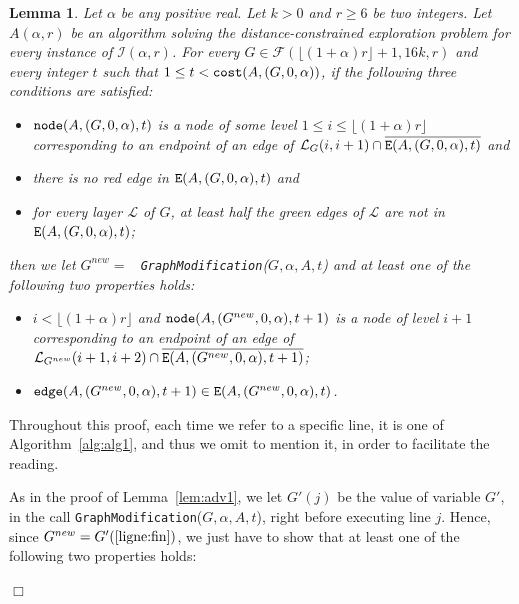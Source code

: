 \documentclass[11pt]{article}
\newtheorem{lemma}{Lemma}[section]
\newcommand{\qed}{\hfill $\Box$ \bigbreak}
\newenvironment{proof}{\noindent {\bf Proof.}}{\qed}
\begin{document}
{\begin{lemma}
\label{lem:adv2}
Let $\alpha$ be any positive real. Let $k>0$ and $r\geq 6$ be two integers.
%
Let $A(\alpha,r)$ be an algorithm solving the distance-constrained exploration problem for every instance of $\mathcal{I}(\alpha,r)$.
%
For every $G\in\mathcal{F}(\lfloor(1+\alpha)r\rfloor+1,16k,r)$ and every integer $t$ such that $1\leq t < {\tt cost}(A,(G,0,\alpha))$, if the following three conditions are satisfied: 
\begin{itemize}
\item ${\tt node}(A,(G,0,\alpha),t)$ is a node of some level $1\leq i\leq\lfloor(1+\alpha)r\rfloor$ corresponding to an endpoint of an edge of $\mathcal{L}_{G}(i,i+1)\cap\overline{{\tt E}(A,(G,0,\alpha),t)}$ and
\item there is no red edge in ${\tt E}(A,(G,0,\alpha),t)$ and
\item for every layer $\mathcal{L}$ of $G$, at least half the green edges of $\mathcal{L}$ are not in ${\tt E}(A,(G,0,\alpha),t)$;
\end{itemize} 
then we let $G^{new}=$ {\tt
  GraphModification}($G,\alpha,A,t$) and at least one of the
following two properties holds:
\begin{itemize}
\item $i<\lfloor(1+\alpha)r\rfloor$ and ${\tt node}(A,(G^{new},0,\alpha),t+1)$ is a node of level $i+1$ corresponding to an endpoint of an edge of $\mathcal{L}_{G^{new}}(i+1,i+2)\cap\overline{{\tt E}(A,(G^{new},0,\alpha),t+1)}$;
\item ${\tt edge}(A,(G^{new},0,\alpha),t+1)\in{\tt E}(A,(G^{new},0,\alpha),t)$.
\end{itemize}
\end{lemma}

\begin{proof}
Throughout this proof, each time we refer to a specific line, it is one of Algorithm~\ref{alg:alg1}, and thus we
omit to mention it, in order to facilitate the reading.

As in the proof of Lemma~\ref{lem:adv1}, we let $G'(j)$ be the value of variable $G'$, in the call {\tt GraphModification}($G,\alpha,A,t$), right before executing line $j$. Hence, since $G^{new}=G'(\ref{ligne:fin})$, we just have to show that at least one of the following two properties holds:


\end{proof}}
\end{document}
